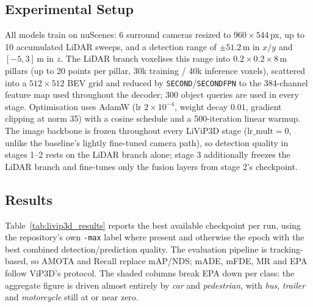 \documentclass[12pt,a4paper]{report}
\begin{document}
\subsection{Experimental Setup}
\quad All models train on nuScenes: 6 surround cameras resized to $960\times544\,$px, up to 10 accumulated LiDAR sweeps, and a detection range of $\pm51.2\,$m in $x/y$ and $[-5,3]\,$m in $z$. The LiDAR branch voxelises this range into $0.2\times0.2\times8\,$m pillars (up to 20 points per pillar, 30k training / 40k inference voxels), scattered into a $512\times512$ BEV grid and reduced by \texttt{SECOND}/\texttt{SECONDFPN} to the 384-channel feature map used throughout the decoder; 300 object queries are used in every stage. Optimisation uses AdamW (lr $2\times10^{-4}$, weight decay $0.01$, gradient clipping at norm 35) with a cosine schedule and a 500-iteration linear warmup. The image backbone is frozen throughout every LiViP3D stage ($\text{lr\_mult}=0$, unlike the baseline's lightly fine-tuned camera path), so detection quality in stages 1--2 rests on the LiDAR branch alone; stage 3 additionally freezes the LiDAR branch and fine-tunes only the fusion layers from stage 2's checkpoint.


\subsection{Results}
\quad Table~\ref{tab:livip3d_results} reports the best available checkpoint per run, using the repository's own \texttt{-max} label where present and otherwise the epoch with the best combined detection/prediction quality. The evaluation pipeline is tracking-based, so AMOTA and Recall replace mAP/NDS; mADE, mFDE, MR and EPA follow ViP3D's protocol. The shaded columns break EPA down per class: the aggregate figure is driven almost entirely by \emph{car} and \emph{pedestrian}, with \emph{bus}, \emph{trailer} and \emph{motorcycle} still at or near zero.
\end{document}
